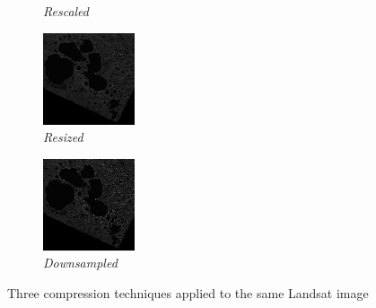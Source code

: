 \documentclass[10pt]{article}
\begin{document}
\begin{figure}
\begin{subfigure}{0.22\textwidth}
      \caption{\textit{Rescaled}}
      \label{fig:image_2}
  \end{subfigure}
  \hfill
  \begin{subfigure}{0.22\textwidth}
      \centering
      \includegraphics[width=\linewidth]{resize_good.jpg}
      \caption{\textit{Resized}}
      \label{fig:image_3}
  \end{subfigure}
  \hfill
  \begin{subfigure}{0.22\textwidth}
      \centering
      \includegraphics[width=\linewidth]{resample_good.jpg}
      \caption{\textit{Downsampled}}
      \label{fig:image_4}
  \end{subfigure}
  \caption{Three compression techniques applied to the same Landsat image}
  \label{fig:downsample}
\end{figure}
\end{document}
